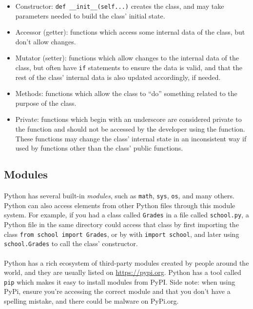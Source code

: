 \documentclass[letter,10pt]{article}
\begin{document}
\begin{itemize}
    \item Constructor: \verb|def __init__(self...)| creates the class, and may take parameters needed to build the class' initial state.
    \item Accessor (getter): functions which access some internal data of the class, but don't allow changes.
    \item Mutator (setter): functions which allow changes to the internal data of the class, but often have \verb|if| statements to ensure the data is valid, and that the rest of the class' internal data is also updated accordingly, if needed.
    \item Methods: functions which allow the class to ``do'' something related to the purpose of the class.
    \item Private: functions which begin with an underscore are considered private to the function and should not be accessed by the developer using the function. These functions may change the class' internal state in an inconsistent way if used by functions other than the class' public functions.
\end{itemize}

\subsection{Modules}
\paragraph{}Python has several built-in \textit{modules}, such as \verb|math|, \verb|sys|, \verb|os|, and many others. Python can also access elements from other Python files through this module system. For example, if you had a class called \verb|Grades| in a file called \verb|school.py|, a Python file in the same directory could access that class by first importing the class \verb|from school import Grades|, or by with \verb|import school|, and later using \verb|school.Grades| to call the class' constructor.

\paragraph{}Python has a rich ecosystem of third-party modules created by people around the world, and they are usually listed on \url{https://pypi.org}. Python has a tool called \verb|pip| which makes it easy to install modules from PyPI. Side note: when using PyPi, ensure you're accessing the correct module and that you don't have a spelling mistake, and there could be malware on PyPi.org.
\end{document}
